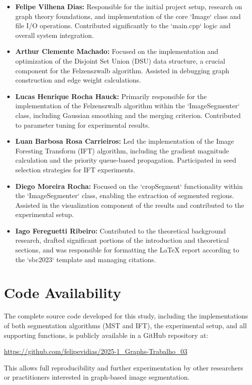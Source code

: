 \documentclass{sbc2023}
\begin{document}
\begin{itemize}
    \item \textbf{Felipe Vilhena Dias:} Responsible for the initial project setup, research on graph theory foundations, and implementation of the core `Image` class and file I/O operations. Contributed significantly to the `main.cpp` logic and overall system integration.
    \item \textbf{Arthur Clemente Machado:} Focused on the implementation and optimization of the Disjoint Set Union (DSU) data structure, a crucial component for the Felzenszwalb algorithm. Assisted in debugging graph construction and edge weight calculations.
    \item \textbf{Lucas Henrique Rocha Hauck:} Primarily responsible for the implementation of the Felzenszwalb algorithm within the `ImageSegmenter` class, including Gaussian smoothing and the merging criterion. Contributed to parameter tuning for experimental results.
    \item \textbf{Luan Barbosa Rosa Carrieiros:} Led the implementation of the Image Foresting Transform (IFT) algorithm, including the gradient magnitude calculation and the priority queue-based propagation. Participated in seed selection strategies for IFT experiments.
    \item \textbf{Diego Moreira Rocha:} Focused on the `cropSegment` functionality within the `ImageSegmenter` class, enabling the extraction of segmented regions. Assisted in the visualization component of the results and contributed to the experimental setup.
    \item \textbf{Iago Fereguetti Ribeiro:} Contributed to the theoretical background research, drafted significant portions of the introduction and theoretical sections, and was responsible for formatting the LaTeX report according to the `sbc2023` template and managing citations.
\end{itemize}

\section*{Code Availability}
\label{sec:code_availability}

The complete source code developed for this study, including the implementations of both segmentation algorithms (MST and IFT), the experimental setup, and all supporting functions, is publicly available in a GitHub repository at:

\url{https://github.com/felipevidias/2025-1_Graphs-Trabalho_03}

This allows full reproducibility and further experimentation by other researchers or practitioners interested in graph-based image segmentation.


\nocite{*} %
\printbibliography[title={References}] %
\end{document}
